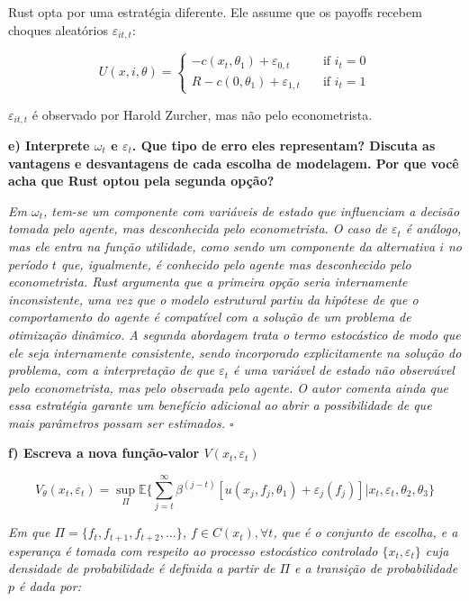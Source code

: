 \documentclass[12pt,a4paper]{article}
\begin{document}
Rust opta por uma estratégia diferente. Ele assume que os payoffs
recebem choques aleatórios \(\varepsilon_{it,t}\):

\[ U(x,i,\theta) = 
  \begin{cases}
    -c(x_t,\theta_1) + \varepsilon_{0,t}    & \quad \text{if } i_t=0\\
    R - c(0,\theta_1) + \varepsilon_{1,t}  & \quad \text{if } i_t=1
  \end{cases}
\]

\(\varepsilon_{it,t}\) é observado por Harold Zurcher, mas não pelo
econometrista.

\textbf{e) Interprete \(\omega_t\) e \(\varepsilon_t\). Que tipo de erro
eles representam? Discuta as vantagens e desvantagens de cada escolha de
modelagem. Por que você acha que Rust optou pela segunda opção?}

\emph{Em \(\omega_t\), tem-se um componente com variáveis de estado que
influenciam a decisão tomada pelo agente, mas desconhecida pelo
econometrista. O caso de \(\varepsilon_t\) é análogo, mas ele entra na
função utilidade, como sendo um componente da alternativa \(i\) no
período \(t\) que, igualmente, é conhecido pelo agente mas desconhecido
pelo econometrista. Rust argumenta que a primeira opção seria
internamente inconsistente, uma vez que o modelo estrutural partiu da
hipótese de que o comportamento do agente é compatível com a solução de
um problema de otimização dinâmico. A segunda abordagem trata o termo
estocástico de modo que ele seja internamente consistente, sendo
incorporado explicitamente na solução do problema, com a interpretação
de que \(\varepsilon_t\) é uma variável de estado não observável pelo
econometrista, mas pelo observada pelo agente. O autor comenta ainda que
essa estratégia garante um benefício adicional ao abrir a possibilidade
de que mais parâmetros possam ser estimados. \(\square\)}

\textbf{f) Escreva a nova função-valor \(V(x_t,\varepsilon_t)\)}

\[
V_\theta (x_t,\varepsilon_t) = \sup_\Pi \mathbb{E}\Bigg\{\sum_{j=t}^\infty \beta^{(j-t)}[u(x_j,f_j,\theta_1) + \varepsilon_j(f_j)]|x_t,\varepsilon_t,\theta_2,\theta_3 \Bigg\}
\]

\emph{Em que \(\Pi = \{f_t,f_{t+1},f_{t+2},...\}\),
\(f \in C(x_t), \forall t\), que é o conjunto de escolha, e a esperança
é tomada com respeito ao processo estocástico controlado
\(\{x_t,\varepsilon_t\}\) cuja densidade de probabilidade é definida a
partir de \(\Pi\) e a transição de probabilidade \(p\) é dada por:}
\end{document}
